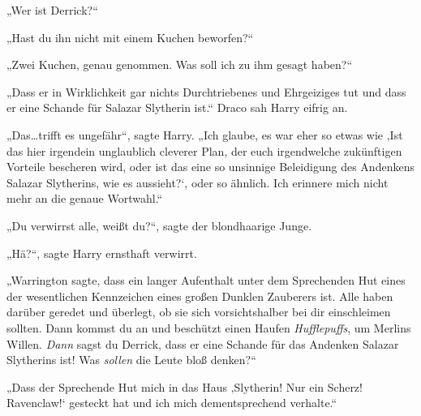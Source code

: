 „Wer ist Derrick?“

„Hast du ihn nicht mit einem Kuchen beworfen?“

„Zwei Kuchen, genau genommen. Was soll ich zu ihm gesagt haben?“

„Dass er in Wirklichkeit gar nichts Durchtriebenes und Ehrgeiziges tut und dass er eine Schande für Salazar Slytherin ist.“ Draco sah Harry eifrig an.

„Das…trifft es ungefähr“, sagte Harry. „Ich glaube, es war eher so etwas wie ‚Ist das hier irgendein unglaublich cleverer Plan, der euch irgendwelche zukünftigen Vorteile bescheren wird, oder ist das eine so unsinnige Beleidigung des Andenkens Salazar Slytherins, wie es aussieht?‘, oder so ähnlich. Ich erinnere mich nicht mehr an die genaue Wortwahl.“

„Du verwirrst alle, weißt du?“, sagte der blondhaarige Junge.

„Hä?“, sagte Harry ernsthaft verwirrt.

„Warrington sagte, dass ein langer Aufenthalt unter dem Sprechenden Hut eines der wesentlichen Kennzeichen eines großen Dunklen Zauberers ist. Alle haben darüber geredet und überlegt, ob sie sich vorsichtshalber bei dir einschleimen sollten. Dann kommst du an und beschützt einen Haufen \emph{Hufflepuffs}, um Merlins Willen. \emph{Dann} sagst du Derrick, dass er eine Schande für das Andenken Salazar Slytherins ist! Was \emph{sollen} die Leute bloß denken?“

„Dass der Sprechende Hut mich in das Haus ‚Slytherin! Nur ein Scherz! Ravenclaw!‘ gesteckt hat und ich mich dementsprechend verhalte.“

